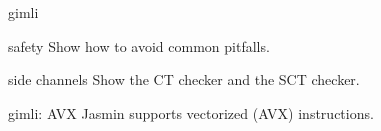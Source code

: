 \documentclass[
  xcolor={table,dvipsnames},
]{beamer}
\newcommand{\hint}[1]{{\color{Red}{[HINT: #1]}}}
\begin{document}
\begin{frame}{gimli}
  \hint{Back to gimli.}
\end{frame}

\begin{frame}{safety}
  Show how to avoid common pitfalls.
\end{frame}

\begin{frame}{side channels}
  Show the CT checker and the SCT checker.
\end{frame}

\begin{frame}{gimli: AVX}
  Jasmin supports vectorized (AVX) instructions.
\end{frame}
\end{document}
